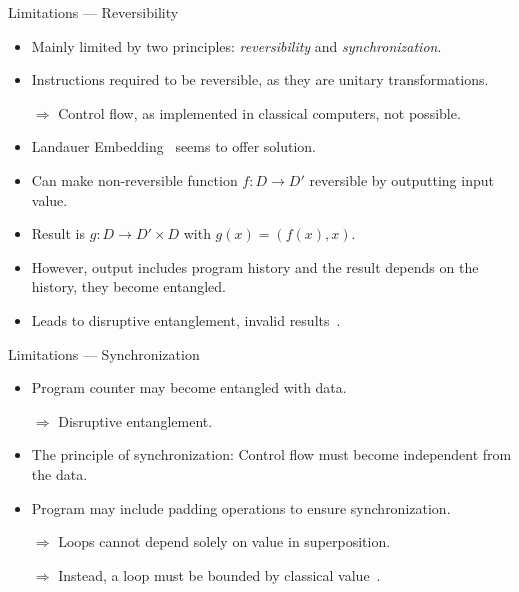 \begin{frame}{Limitations --- Reversibility}
    \begin{itemize}
        \item Mainly limited by two principles: \emph{reversibility} and \emph{synchronization}.
        \item Instructions required to be reversible, as they are unitary transformations.
        \item[$\Rightarrow$] Control flow, as implemented in classical computers, not possible.
        \item Landauer Embedding~\cite{Land61} seems to offer solution.
        \item Can make non-reversible function $f : D \to D'$ reversible by outputting input value.
        \item Result is $g : D \to D' \times D$ with $g(x) = (f(x), x)$.
        \item However, output includes program history and the result depends on the history, they become entangled.
        \item Leads to disruptive entanglement, invalid results~\cite{YVC24}.
    \end{itemize}
\end{frame}

\begin{frame}{Limitations --- Synchronization}
    \begin{itemize}
        \item Program counter may become entangled with data.
        \item[$\Rightarrow$] Disruptive entanglement.
        \item The principle of synchronization: Control flow must become independent from the data.
        \item Program may include padding operations to ensure synchronization.
        \item[$\Rightarrow$] Loops cannot depend solely on value in superposition.
        \item[$\Rightarrow$] Instead, a loop must be bounded by classical value~\cite{YVC24}. 
    \end{itemize}
\end{frame}

